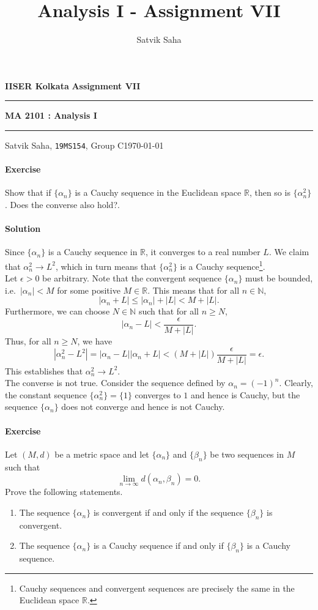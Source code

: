 \documentclass[10pt]{article}
\title{Analysis I - Assignment VII}
\author{Satvik Saha}
\date{}
\newcounter{prob}
\def\problem{\stepcounter{prob}\paragraph{Exercise \arabic{prob}}}
\def\solution{\paragraph{Solution}}
\begin{document}
        \par\textbf{IISER Kolkata} \hfill \textbf{Assignment VII}
        \vspace{3pt}
        \hrule
        \vspace{3pt}
        \begin{center}
                \LARGE{\textbf{MA 2101 : Analysis I}}
        \end{center}
        \vspace{3pt}
        \hrule
        \vspace{3pt}
        Satvik Saha, \texttt{19MS154}, Group C\hfill\today
        \vspace{20pt}

        \problem Show that if $\{\alpha_n\}$ is a Cauchy sequence in the Euclidean space $\mathbb{R}$, then so is $\{\alpha_n^2\}$.
        Does the converse also hold?.

        \solution Since $\{\alpha_n\}$ is a Cauchy sequence in $\mathbb{R}$, it converges to a real number $L$.
        We claim that $\alpha_n^2 \to L^2$, which in turn means that $\{\alpha_n^2\}$ is a Cauchy sequence\footnote{
                Cauchy sequences and convergent sequences are precisely the same in the Euclidean space $\mathbb{R}$.
        }. \\

        Let $\epsilon > 0$ be arbitrary.
        Note that the convergent sequence $\{\alpha_n\}$ must be bounded, i.e.\ $|\alpha_n| < M$ for some positive $M \in \mathbb{R}$.
        This means that for all $n \in \mathbb{N}$,
        \[
                |\alpha_n + L| \leq |\alpha_n| + |L| < M + |L|.
        \]
        Furthermore, we can choose $N \in \mathbb{N}$ such that for all $n \geq N$, 
        \[
                |\alpha_n - L| < \frac{\epsilon}{M + |L|}.
        \]
        Thus, for all $n \geq N$, we have
        \[
                |\alpha_n^2 - L^2| = |\alpha_n - L| |\alpha_n + L| < (M + |L|)\frac{\epsilon}{M + |L|} = \epsilon.
        \]
        This establishes that $\alpha_n^2 \to L^2$. \\

        The converse is not true. Consider the sequence defined by $\alpha_n = (-1)^n$. Clearly, the constant sequence $\{\alpha_n^2\} = \{1\}$
        converges to $1$ and hence is Cauchy, but the sequence $\{\alpha_n\}$ does not converge and hence is not Cauchy.

        \problem Let $(M, d)$ be a metric space and let $\{\alpha_n\}$ and $\{\beta_n\}$ be two sequences in $M$ such that
        \[
                \lim_{n \to \infty} d(\alpha_n, \beta_n) = 0.
        \]
        Prove the following statements.
        \begin{enumerate}
                \item The sequence $\{\alpha_n\}$ is convergent if and only if the sequence $\{\beta_n\}$ is convergent.
                \item The sequence $\{\alpha_n\}$ is a Cauchy sequence if and only if $\{\beta_n\}$ is a Cauchy sequence.
        \end{enumerate}
\end{document}
